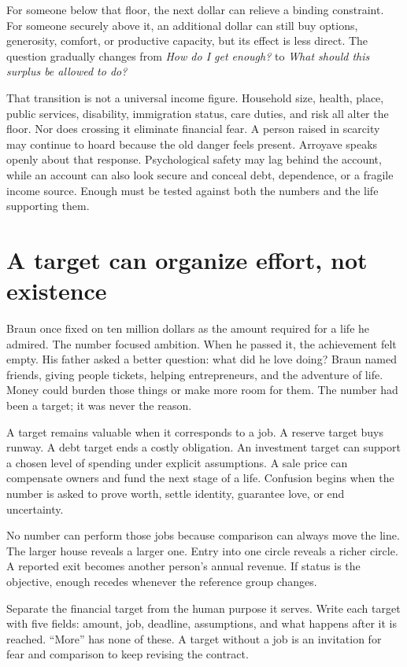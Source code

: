 For someone below that floor, the next dollar can relieve a binding
constraint. For someone securely above it, an additional dollar can still buy
options, generosity, comfort, or productive capacity, but its effect is less
direct. The question gradually changes from \emph{How do I get enough?} to
\emph{What should this surplus be allowed to do?}

That transition is not a universal income figure. Household size, health,
place, public services, disability, immigration status, care duties, and risk
all alter the floor. Nor does crossing it eliminate financial fear. A person
raised in scarcity may continue to hoard because the old danger feels present.
Arroyave speaks openly about that response. Psychological safety may lag
behind the account, while an account can also look secure and conceal debt,
dependence, or a fragile income source. Enough must be tested against both the
numbers and the life supporting them.

\section{A target can organize effort, not existence}

Braun once fixed on ten million dollars as the amount required for a life he
admired. The number focused ambition. When he passed it, the achievement felt
empty. His father asked a better question: what did he love doing? Braun named
friends, giving people tickets, helping entrepreneurs, and the adventure of
life. Money could burden those things or make more room for them. The number
had been a target; it was never the reason.

A target remains valuable when it corresponds to a job. A reserve target buys
runway. A debt target ends a costly obligation. An investment target can
support a chosen level of spending under explicit assumptions. A sale price
can compensate owners and fund the next stage of a life. Confusion begins
when the number is asked to prove worth, settle identity, guarantee love, or
end uncertainty.

No number can perform those jobs because comparison can always move the line.
The larger house reveals a larger one. Entry into one circle reveals a richer
circle. A reported exit becomes another person's annual revenue. If status is
the objective, enough recedes whenever the reference group changes.

Separate the financial target from the human purpose it serves. Write each
target with five fields: amount, job, deadline, assumptions, and what happens
after it is reached. ``More'' has none of these. A target without a job is an
invitation for fear and comparison to keep revising the contract.

